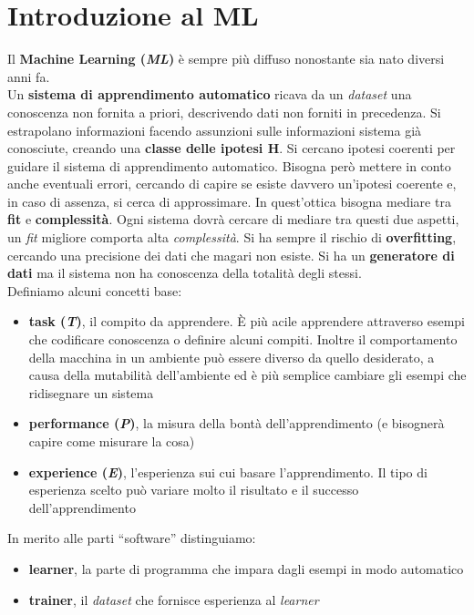 \documentclass[a4paper,12pt, oneside]{book}
\begin{document}
\chapter{Introduzione al ML}
Il \textbf{Machine Learning (\textit{ML})} è sempre più diffuso nonostante sia
nato diversi anni fa.\\
Un \textbf{sistema di apprendimento automatico} ricava da un \textit{dataset}
una conoscenza non fornita a priori, descrivendo dati non forniti in
precedenza. Si estrapolano informazioni facendo assunzioni sulle informazioni
sistema già conosciute, creando una \textbf{classe delle ipotesi H}. Si cercano
ipotesi coerenti per guidare il sistema di apprendimento automatico. Bisogna
però mettere in conto anche eventuali errori, cercando di capire se esiste
davvero un'ipotesi coerente e, in caso di assenza, si cerca di approssimare. In
quest'ottica bisogna mediare tra \textbf{fit} e \textbf{complessità}. Ogni
sistema dovrà cercare di mediare tra questi due aspetti, un \textit{fit}
migliore comporta alta \textit{complessità}. Si ha sempre il rischio di
\textbf{overfitting}, cercando una precisione dei dati che magari non esiste. Si
ha un \textbf{generatore di dati} ma il sistema non ha conoscenza della totalità
degli stessi.\\
Definiamo alcuni concetti base:
\begin{itemize}
  \item \textbf{task (\textit{T})}, il compito da apprendere. È più acile
  apprendere attraverso esempi che codificare conoscenza o definire alcuni
  compiti. Inoltre il comportamento della macchina in un ambiente può essere
  diverso da quello desiderato, a causa della mutabilità dell'ambiente ed è più
  semplice cambiare gli esempi che ridisegnare un sistema 
  \item \textbf{performance (\textit{P})}, la misura della bontà
  dell'apprendimento (e bisognerà capire come misurare la cosa)
  \item \textbf{experience (\textit{E})}, l'esperienza sui cui basare
  l'apprendimento. Il tipo di esperienza scelto può variare molto il risultato e
  il successo dell'apprendimento
\end{itemize}
In merito alle parti ``software'' distinguiamo:
\begin{itemize}
  \item \textbf{learner}, la parte di programma che impara dagli esempi in modo
  automatico
  \item \textbf{trainer}, il \textit{dataset} che fornisce esperienza al
  \textit{learner}
\end{itemize}
\end{document}
